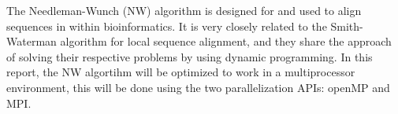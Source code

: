 The Needleman-Wunch (NW) algorithm is designed for and used to align sequences in within bioinformatics. It is very closely related to the Smith-Waterman algorithm for local sequence alignment, and they share the approach of solving their respective problems by using dynamic programming. In this report, the NW algortihm will be optimized to work in a multiprocessor environment, this will be done using the two parallelization APIs: openMP and MPI.
